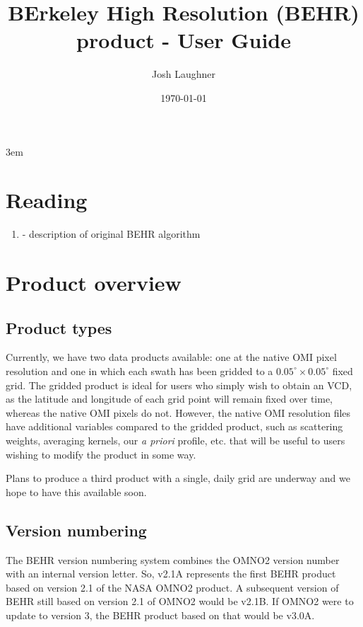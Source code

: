 \documentclass[12pt]{article}
\title{BErkeley High Resolution (BEHR) \ce{NO2} product - User Guide}
\author{Josh Laughner}
\date{\today}
\begin{document}
\maketitle

\emergencystretch 3em

\section{Reading}

	\begin{enumerate}
		\item \citet{russell11} - description of original BEHR algorithm
	\end{enumerate}


\section{Product overview}

	\subsection{Product types}
	Currently, we have two data products available: one at the native OMI pixel resolution and one in which each swath has been gridded to a $0.05^\circ \times 0.05^\circ$ fixed grid. The gridded product is ideal for users who simply wish to obtain an  VCD, as the latitude and longitude of each grid point will remain fixed over time, whereas the native OMI pixels do not. However, the native OMI resolution files have additional variables compared to the gridded product, such as scattering weights, averaging kernels, our  \emph{a priori} profile, etc. that will be useful to users wishing to modify the product in some way.
	
	Plans to produce a third product with a single, daily grid are underway and we hope to have this available soon.
	
	\subsection{Version numbering}
	The BEHR version numbering system combines the OMNO2 version number with an
internal version letter. So, v2.1A represents the first BEHR product based on
version 2.1 of the NASA OMNO2 product. A subsequent version of BEHR still based
on version 2.1 of OMNO2 would be v2.1B. If OMNO2 were to update to version 3,
the BEHR product based on that would be v3.0A.
\end{document}

